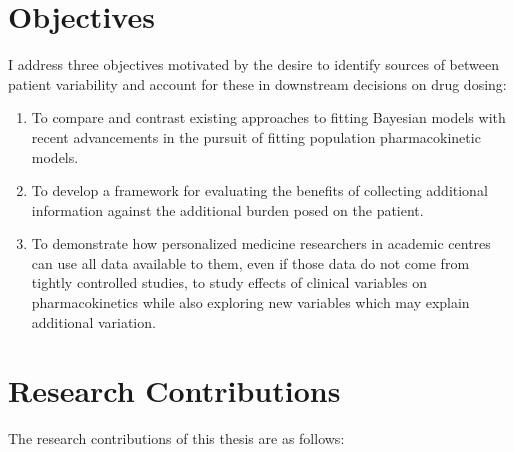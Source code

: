 

\section{Objectives}

I address three objectives motivated by the desire to identify sources of between patient variability and account for these in downstream decisions on drug dosing:

\begin{enumerate}[1)]
	\item To compare and contrast existing approaches to fitting Bayesian models with recent advancements in the pursuit of fitting population pharmacokinetic models. 
	
	\item To develop a framework for evaluating the  benefits of collecting additional information against the additional burden posed on the patient.
	
	\item To demonstrate how personalized medicine researchers in academic centres can use all data available to them, even if those data do not come from tightly controlled studies, to study effects of clinical variables on pharmacokinetics while also exploring new variables which may explain additional variation.
\end{enumerate}


\section{Research Contributions}

The research contributions of this thesis are as follows:

